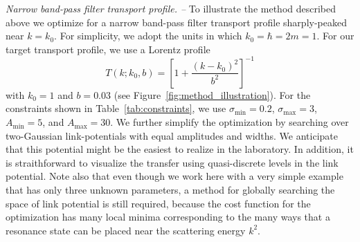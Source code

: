 \documentclass[twocolumn,amsmath,amssymb,showpacs,prl,superscriptaddress,aps]{revtex4-1}
\begin{document}
{\it Narrow band-pass filter transport profile. --}
To illustrate the method described above we optimize for a narrow band-pass filter transport profile sharply-peaked near $k=k_0$. For simplicity, we adopt the units in which $k_0=\hbar=2m=1$. For our target transport profile, we use a Lorentz profile
\begin{equation}\label{eq:Ttarget}
  T(k; k_0,b) = \left[1 + \frac{(k-k_0)^2}{b^2}\right]^{-1}
\end{equation}
with $k_0=1$ and $b=0.03$ (see Figure~\ref{fig:method_illustration}). For the constraints shown in Table~\ref{tab:constraints}, we use $\sigma_{\mathrm{min}}=0.2$, $\sigma_{\mathrm{max}}=3$, $A_{\mathrm{min}}=5$, and $A_{\mathrm{max}}=30$. We further simplify the optimization by searching over two-Gaussian link-potentials with equal amplitudes and widths. We anticipate that this potential might be the easiest to realize in the laboratory. In addition, it is straithforward to visualize the transfer using quasi-discrete levels in the link potential. Note also that even though we work here with a very simple example that has only three unknown parameters, a method for globally searching the space of link potential is still required, because the cost function for the optimization has many local minima corresponding to the many ways that a resonance state can be placed near the scattering energy $k^2$.
\end{document}
